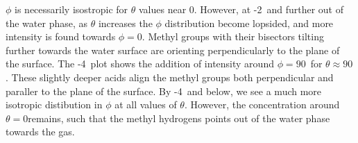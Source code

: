 $\phi$ is necessarily isostropic for $\theta$ values near 0\textdegree. However, at -2\angs~and further out of the water phase, as $\theta$ increases the $\phi$ distribution become lopsided, and more intensity is found towards $\phi=0$\textdegree. Methyl groups with their bisectors tilting further towards the water surface are orienting perpendicularly to the plane of the surface. The -4\angs~plot shows the addition of intensity around $\phi=90$\textdegree~for $\theta \approx 90$\textdegree. These slightly deeper acids align the methyl groups both perpendicular and paraller to the plane of the surface. By -4\angs~and below, we see a much more isotropic distibution in $\phi$ at all values of $\theta$. However, the concentration around $\theta=0$\textdegree remains, such that the methyl hydrogens points out of the water phase towards the gas.
